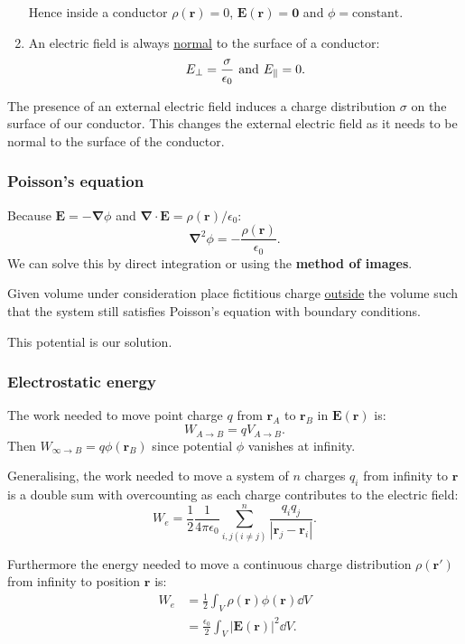 \documentclass{article}
\newcommand{\vc}[1]{\boldsymbol{#1}}
\begin{document}
\begin{multicols*}{3}
\begin{enumerate}
    Hence inside a conductor
    $\rho(\vc{r})=0$, $\vc{E}(\vc{r})=\vc{0}$
    and $\phi=\text{constant}$.

    \item An electric field is always \underline{normal}
    to the surface of a conductor:
    $$E_{\perp}=\frac{\sigma}{\epsilon_0}
    \hspace{0.05in}\text{and}\hspace{0.05in}
    E_{\parallel}=0.$$
\end{enumerate}
The presence of an external electric field induces
a charge distribution $\sigma$ on the surface of our conductor.
This changes the external electric field as it
needs to be normal to the surface of the conductor.

\subsubsection*{Poisson's equation}
Because $\vc{E}=-\vc{\nabla}\phi$ and
$\vc{\nabla}\cdot\vc{E}=\rho(\vc{r})/\epsilon_0$:
$$\vc{\nabla}^2\phi=-\frac{\rho(\vc{r})}{\epsilon_0}.$$
We can solve this by direct integration
or using the \textbf{method of images}.

Given volume under consideration place fictitious
charge \underline{outside} the volume such that the system
still satisfies Poisson's equation with boundary conditions.

This potential is our solution.

\newcolumn

\subsubsection*{Electrostatic energy}
The work needed to move point charge $q$
from $\vc{r}_A$ to $\vc{r}_B$ in $\vc{E}(\vc{r})$ is:
$$W_{A\rightarrow B}=q V_{A\rightarrow B}.$$
Then $W_{\infty\rightarrow B}=q\phi(\vc{r}_B)$
since potential $\phi$ vanishes at infinity.

Generalising, the work needed to move a system of
$n$ charges $q_i$ from infinity to $\vc{r}$
is a double sum with overcounting as each charge 
contributes to the electric field:
$$W_e=\frac{1}{2}\frac{1}{4\pi\epsilon_0}
\sum_{i,j (i\neq j)}^{n}\frac{q_i q_j}
{|\vc{r}_j-\vc{r}_i|}.$$

Furthermore the energy needed to move a continuous
charge distribution $\rho(\vc{r}')$ from infinity 
to position $\vc{r}$ is:
\begin{align*}
    W_e
    &=\frac{1}{2}\int_V
    \rho(\vc{r})\phi(\vc{r})\dd V \\
    &=\frac{\epsilon_0}{2}\int_V|\vc{E}(\vc{r})|^2\dd V.
\end{align*}


\end{multicols*}
\end{document}
